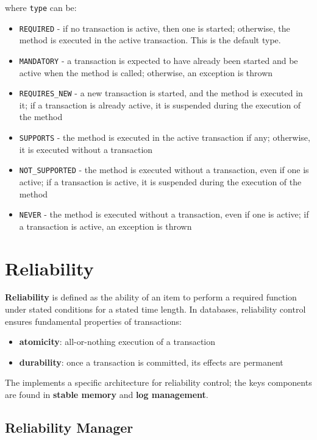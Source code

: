 \documentclass[english]{article}
\begin{document}
where \texttt{type} can be:

\begin{itemize}[label=\textbf{\texttt{>}}]
  \item \texttt{REQUIRED} - if no transaction is active, then one is started; otherwise, the method is executed in the active transaction. This is the default type.
  \item \texttt{MANDATORY} - a transaction is expected to have already been started and be active when the method is called; otherwise, an exception is thrown
  \item \texttt{REQUIRES\_NEW} - a new transaction is started, and the method is executed in it; if a transaction is already active, it is suspended during the execution of the method
  \item \texttt{SUPPORTS} - the method is executed in the active transaction if any; otherwise, it is executed without a transaction
  \item \texttt{NOT\_SUPPORTED} - the method is executed without a transaction, even if one is active; if a transaction is active, it is suspended during the execution of the method
  \item \texttt{NEVER} - the method is executed without a transaction, even if one is active; if a transaction is active, an exception is thrown
\end{itemize}

\clearpage

\section{Reliability}

\textbf{Reliability} is defined as the ability of an item to perform a required function under stated conditions for a stated time length.
In databases, reliability control ensures fundamental properties of transactions:

\begin{itemize}
  \item \textbf{atomicity}: all-or-nothing execution of a transaction
  \item \textbf{durability}: once a transaction is committed, its effects are permanent
\end{itemize}

The \dbms implements a specific architecture for reliability control;
the keys components are found in \textbf{stable memory} and \textbf{log management}.

\subsection{Reliability Manager}
\end{document}
